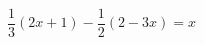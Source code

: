 \begin{ex}[type=equation]
	\begin{condition}
		$\dfrac{1}{3}(2x+1) -\dfrac{1}{2}(2 - 3x) = x$
	\end{condition}
\end{ex}
